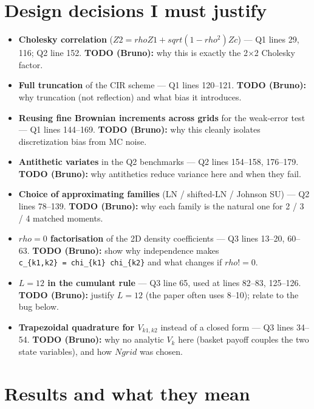 \documentclass[
  11pt,
]{article}
\providecommand{\tightlist}{%
  \setlength{\itemsep}{0pt}\setlength{\parskip}{0pt}}
\begin{document}
\hypertarget{design-decisions-i-must-justify}{%
\section{Design decisions I must
justify}\label{design-decisions-i-must-justify}}

\begin{itemize}
\tightlist
\item
  \textbf{Cholesky correlation} (\(Z2 = rho Z1 + sqrt(1-rho^2) Zc\)) ---
  Q1 lines 29, 116; Q2 line 152. \textbf{TODO (Bruno):} why this is
  exactly the 2×2 Cholesky factor.
\item
  \textbf{Full truncation} of the CIR scheme --- Q1 lines 120--121.
  \textbf{TODO (Bruno):} why truncation (not reflection) and what bias
  it introduces.
\item
  \textbf{Reusing fine Brownian increments across grids} for the
  weak-error test --- Q1 lines 144--169. \textbf{TODO (Bruno):} why this
  cleanly isolates discretization bias from MC noise.
\item
  \textbf{Antithetic variates} in the Q2 benchmarks --- Q2 lines
  154--158, 176--179. \textbf{TODO (Bruno):} why antithetics reduce
  variance here and when they fail.
\item
  \textbf{Choice of approximating families} (LN / shifted-LN / Johnson
  SU) --- Q2 lines 78--139. \textbf{TODO (Bruno):} why each family is
  the natural one for 2 / 3 / 4 matched moments.
\item
  \textbf{\(rho = 0\) factorisation} of the 2D density coefficients ---
  Q3 lines 13--20, 60--63. \textbf{TODO (Bruno):} show why independence
  makes \texttt{c\_\{k1,k2\}\ =\ chi\_\{k1\}\ chi\_\{k2\}} and what
  changes if \(rho != 0\).
\item
  \textbf{\(L = 12\) in the cumulant rule} --- Q3 line 65, used at lines
  82--83, 125--126. \textbf{TODO (Bruno):} justify \(L = 12\) (the paper
  often uses 8--10); relate to the bug below.
\item
  \textbf{Trapezoidal quadrature for \(V_{k1,k2}\)} instead of a closed
  form --- Q3 lines 34--54. \textbf{TODO (Bruno):} why no analytic
  \(V_k\) here (basket payoff couples the two state variables), and how
  \(Ngrid\) was chosen.
\end{itemize}

\hypertarget{results-and-what-they-mean}{%
\section{Results and what they mean}\label{results-and-what-they-mean}}
\end{document}
